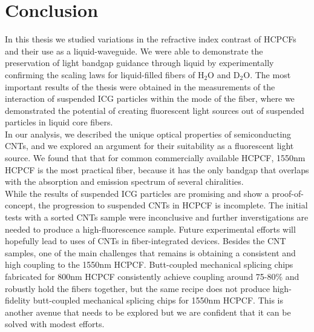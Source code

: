 \chapter{Conclusion}
In this thesis we studied variations in the refractive index contrast of HCPCFs and their use as a liquid-waveguide. We were able to demonstrate the preservation of light bandgap guidance through liquid by experimentally confirming the scaling laws for liquid-filled fibers of H${}_2$O and D${}_2$O.
The most important results of the thesis were obtained in the measurements of the interaction of suspended ICG particles within the mode of the fiber, where we demonstrated the potential of creating fluorescent light sources out of suspended particles in liquid core fibers.\\

In our analysis, we described the unique optical properties of semiconducting CNTs, and we explored an argument for their suitability as a fluorescent light source. We found that that for common commercially available HCPCF, 1550nm HCPCF is the most practical fiber, because it has the only bandgap that overlaps with the absorption and emission spectrum of several chiralities.\\

While the results of suspended ICG particles are promising and show a proof-of-concept, the progression to suspended CNTs in HCPCF is incomplete. The initial tests with a sorted CNTs sample were inconclusive and further inverstigations are needed to produce a high-fluorescence sample. Future experimental efforts will hopefully lead to uses of CNTs in fiber-integrated devices. Besides the CNT samples, one of the main challenges that remains is obtaining a consistent and high coupling to the 1550nm HCPCF. Butt-coupled mechanical splicing chips fabricated for 800nm HCPCF consistently achieve coupling around 75-80\% and robustly hold the fibers together\cite{maruf}, but the same recipe does not produce high-fidelity butt-coupled mechanical splicing chips for 1550nm HCPCF. This is another avenue that needs to be explored but we are confident that it can be solved with modest efforts.\\
